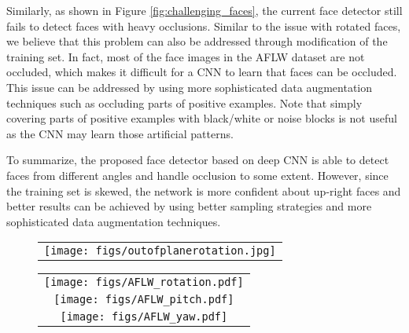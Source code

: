 \documentclass{sig-alternate-2013}
\begin{document}
Similarly, as shown in Figure \ref{fig:challenging_faces}, the current face detector still fails to detect faces with heavy occlusions. Similar to the issue with rotated faces, we believe that this problem can also be addressed through modification of the training set. In fact, most of the face images in the AFLW dataset \cite{AFLW} are not occluded, which makes it difficult for a CNN to learn that faces can be occluded. This issue can be addressed by using more sophisticated data augmentation techniques such as occluding parts of positive examples. Note that simply covering parts of positive examples with black/white or noise blocks is not useful as the CNN may learn those artificial patterns. 

To summarize, the proposed face detector based on deep CNN is able to detect faces from different angles and handle occlusion to some extent. However, since the training set is skewed, the network is more confident about up-right faces and better results can be achieved by using better sampling strategies and more sophisticated data augmentation techniques.


\begin{figure}[t]
  \centering
	\begin{tabular}{c}
    	\texttt{[image: figs/outofplanerotation.jpg]} \\
    \end{tabular}
  \caption{}
  \label{fig:face_rotations}
\end{figure}




\begin{figure}[t]
  \centering
	\begin{tabular}{c}
    	\texttt{[image: figs/AFLW\_rotation.pdf]} \\
    	\texttt{[image: figs/AFLW\_pitch.pdf]} \\
    	\texttt{[image: figs/AFLW\_yaw.pdf]} \\
    \end{tabular}
  \caption{}
  \label{fig:aflw_example_hist}
\end{figure}
\end{document}
